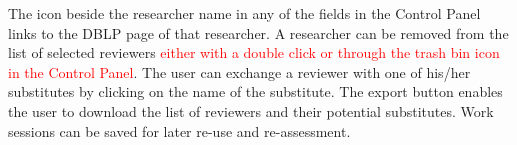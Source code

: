 The icon beside the researcher name in any of the fields in the Control Panel links to the DBLP page of that researcher. 
A researcher can be removed from the list of selected reviewers \textcolor{red}{either with a double click or through the trash bin icon in the Control Panel}. The user can exchange a reviewer with one of his/her substitutes by clicking on the name of the substitute.
The export button enables the user to download the list of reviewers and their potential substitutes. Work sessions can be saved for later re-use and re-assessment. 